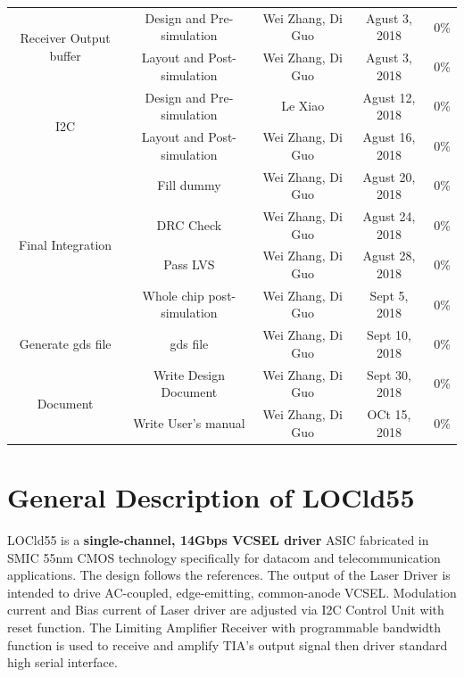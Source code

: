 \documentclass[11pt,a4paper]{article}
\begin{document}
\begin{spacing}{1.25}
\begin{table}[H]
\begin{tabular}{|c|c|c|c|c|}
\hline
\multirow{2}{*}{Receiver Output buffer} & Design and Pre-simulation & Wei Zhang, Di Guo & Agust 3, 2018 & 0\% \\ \cline{2-5}
& Layout and Post-simulation & Wei Zhang, Di Guo & Agust 3, 2018 & 0\% \\
\hline
\multirow{2}{*}{I2C} & Design and Pre-simulation & Le Xiao & Agust 12, 2018 & 0\% \\ \cline{2-5}
& Layout and Post-simulation & Wei Zhang, Di Guo & Agust 16, 2018 & 0\% \\
\hline
\multirow{4}{*}{Final Integration} & Fill dummy & Wei Zhang, Di Guo & Agust 20, 2018 & 0\% \\ \cline{2-5}
& DRC Check & Wei Zhang, Di Guo & Agust 24, 2018 & 0\% \\ \cline{2-5}
& Pass LVS & Wei Zhang, Di Guo & Agust 28, 2018 & 0\% \\ \cline{2-5}
& Whole chip post-simulation & Wei Zhang, Di Guo & Sept 5, 2018 & 0\% \\ 
\hline
Generate gds file & gds file & Wei Zhang, Di Guo & Sept 10, 2018 & 0\% \\
\hline
\multirow{2}{*}{Document} & Write Design Document & Wei Zhang, Di Guo & Sept 30, 2018 & 0\% \\ \cline{2-5}
& Write User's manual & Wei Zhang, Di Guo & OCt 15, 2018 & 0\% \\
\hline

\end{tabular}
\end{table}

\newpage                            %

\section{General Description of LOCld55}    %

LOCld55 is a \textbf{single-channel, 14Gbps VCSEL driver} ASIC fabricated in SMIC 55nm CMOS technology specifically for datacom and telecommunication applications. The design follows the references\cite{ref1}. The output of the Laser Driver is intended to drive AC-coupled, edge-emitting, common-anode VCSEL. Modulation current and Bias current of Laser driver are adjusted via I2C Control Unit with reset function. The Limiting Amplifier Receiver with programmable bandwidth function is used to receive and amplify TIA's output signal then driver standard high serial interface. 


\end{spacing}
\end{document}

